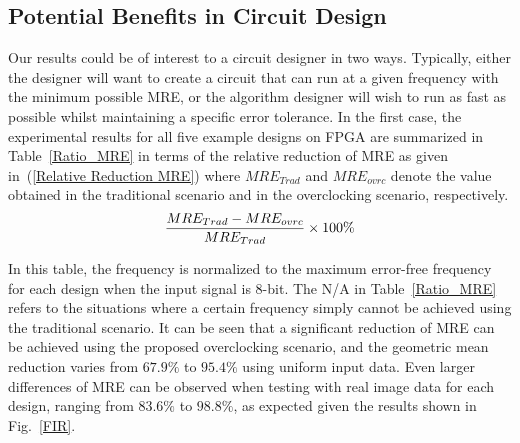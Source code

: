 \documentclass[journal]{IEEEtran}
\begin{document}
\subsection{Potential Benefits in Circuit Design}
Our results could be of interest to a circuit designer in two ways. Typically, either the designer will want to create a circuit that can run at a given frequency with the minimum possible MRE, or the algorithm designer will wish to run as fast as possible whilst maintaining a specific error tolerance. In the first case, the experimental results for all five example designs on FPGA are summarized in Table~\ref{Ratio_MRE} in terms of the relative reduction of MRE as given in~(\ref{Relative Reduction MRE}) where $MRE_{Trad}$ and $MRE_{ovrc}$ denote the value obtained in the traditional scenario and in the overclocking scenario, respectively.
\begin{eqnarray}\label{Relative Reduction MRE}
\scriptsize
  \frac{MRE_{Trad}-MRE_{ovrc}}{MRE_{Trad}}\times 100\%
\end{eqnarray}
\normalsize

In this table, the frequency is normalized to the maximum error-free frequency for each design when the input signal is 8-bit. The N/A in Table~\ref{Ratio_MRE} refers to the situations where a certain frequency simply cannot be achieved using the traditional scenario. It can be seen that a significant reduction of MRE can be achieved using the proposed overclocking scenario, and the geometric mean reduction varies from $67.9\%$ to $95.4\%$ using uniform input data. Even larger differences of MRE can be observed when testing with real image data for each design, ranging from $83.6\%$ to $98.8\%$, as expected given the results shown in Fig.~\ref{FIR}.
\end{document}
